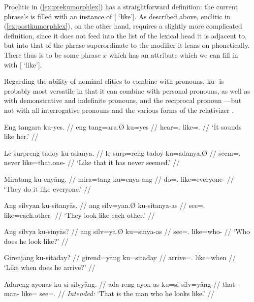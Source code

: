 Proclitic  in (\ref{ex:prekumorphlex}) has a straightforward
definition: the current phrase's \Adjc{} is filled with an instance of [\Pred{}
`like']. As described above, enclitic  in
(\ref{ex:postkumorphlex}), on the other hand, requires a slightly more
complicated definition, since it does not feed into the \Adjc{} list of the
lexical head it is adjacent to, but into that of the phrase superordinate to
the modifier it leans on phonetically. There thus is to be some phrase $x$
which has an \Adjc{} attribute which we can fill in with [\Pred {} `like'].

Regarding the ability of nominal clitics to combine with pronouns, 
{ku-} is probably most versatile in that it can combine with personal pronouns,
as well as with demonstrative and indefinite pronouns, and the reciprocal
pronoun ---but not with all interrogative pronouns and the
various forms of the relativizer .

\pex\label{ex:kupros}
\a\label{ex:kupros_pers}\begingl
	\gla Eng tangara ku-yes. //
	\glb eng tang=ara.Ø ku=yes //
	\glc \AgtTI{} hear=\TsgI{}.\Top{} like=\TsgF{}.\Parg{} //
	\glft `It sounds like her.' //
\endgl

\a\label{ex:kupros_dem}\begingl
	\gla Le surpreng tadoy ku-adanya. //
	\glb le surp=reng tadoy ku=adanya.Ø //
	\glc \PargI{} seem=\TsgI{}.\Aarg{} never like=that.one-\Top{} //
	\glft `Like that it has never seemed.' //
\endgl

\a\label{ex:kupros_indef}\begingl
	\gla Miratang ku-enyāng. //
	\glb mira=tang ku=enya-ang //
	\glc do=\TplM{}.\Aarg{} like=everyone-\Aarg{} //
	\glft `They do it like everyone.' //
\endgl

\a\label{ex:kupros_recip}\begingl
	\gla Ang silvyan ku-sitanyās. //
	\glb ang silv=yan.Ø ku-sitanya-as //
	\glc \AgtT{} see=\TplM{}.\Top{} like=each.other-\Parg{} //
	\glft `They look like each other.' //
\endgl

\a\label{ex:kupros_inter_1}\begingl
	\gla Ang silvya ku-sinyās? //
	\glb ang silv=ya.Ø ku=sinya-as //
	\glc \AgtT{} see=\TsgM{}.\Top{} like=who-\Parg{} //
	\glft `Who does he look like?' //
\endgl

\a\ljudge*\label{ex:kupros_inter_2}\begingl
	\gla Girenjāng ku-sitaday? //
	\glb girend=yāng ku=sitaday //
	\glc arrive=\TsgM{}.\Aarg{} like=when //
	\glft `Like when does he arrive?' //
\endgl

\a\ljudge*\label{ex:kupros_rel}\begingl
	\gla Adareng ayonas ku-si silvyāng. //
	\glb ada-reng ayon-as ku=si silv=yāng //
	\glc that-\AargI{} man-\Parg{} like=\Rel{} see=\TsgM{}.\Aarg{} //
	\glft \textit{Intended:}  `That is the man who he looks like.' //
\endgl

